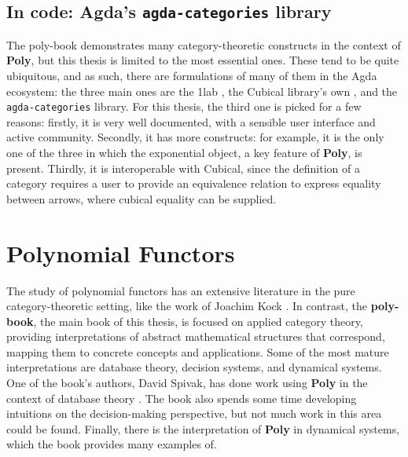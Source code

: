 \subsection{In code: Agda's \texttt{agda-categories} library}

The poly-book demonstrates many category-theoretic constructs in the context of \textbf{Poly}, but this thesis is limited to the most essential ones. These tend to be quite ubiquitous, and as such, there are formulations of many of them in the Agda ecosystem: the three main ones are the 1lab \cite{1lab}, the Cubical library's own \cite{cubical-cat}, and the \texttt{agda-categories} \cite{agda-cats} library. For this thesis, the third one is picked for a few reasons: firstly, it is very well documented, with a sensible user interface and active community. Secondly, it has more constructs: for example, it is the only one of the three in which the exponential object, a key feature of \textbf{Poly}, is present. Thirdly, it is interoperable with Cubical, since the definition of a category requires a user to provide an equivalence relation to express equality between arrows, where cubical equality can be supplied.

\section{Polynomial Functors}

The study of polynomial functors has an extensive literature in the pure category-theoretic setting, like the work of Joachim Kock \cite{kockpoly} \cite{kock2009polynomial}. In contrast, the \textbf{poly-book}, the main book of this thesis, is focused on applied category theory, providing interpretations of abstract mathematical structures that correspond, mapping them to concrete concepts and applications. Some of the most mature interpretations are database theory, decision systems, and dynamical systems. One of the book's authors, David Spivak, has done work using \textbf{Poly} in the context of database theory \cite{spivak2023functorial}. The book also spends some time developing intuitions on the decision-making perspective, but not much work in this area could be found. Finally, there is the interpretation of \textbf{Poly} in dynamical systems, which the book provides many examples of.

